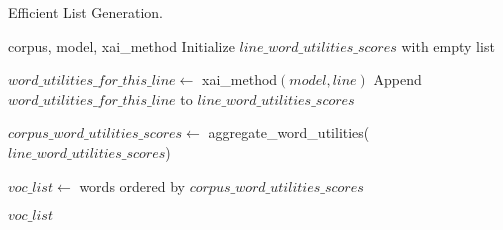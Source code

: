 \begin{algorithm}
\caption{Efficient List Generation.}
\label{alg:efficient-list-generation}
\begin{algorithmic}[1]
\Require corpus, model, xai\_method
\State Initialize $line\_word\_utilities\_scores$ with empty list

    \State $word\_utilities\_for\_this\_line \gets$ xai\_method$(model, line)$
    \State Append $word\_utilities\_for\_this\_line$ to $line\_word\_utilities\_scores$
\EndFor

\State $corpus\_word\_utilities\_scores \gets$ aggregate\_word\_utilities($line\_word\_utilities\_scores$)

\State $voc\_list \gets$ words ordered by $corpus\_word\_utilities\_scores$

\State \Return $voc\_list$
\end{algorithmic}
\end{algorithm}
